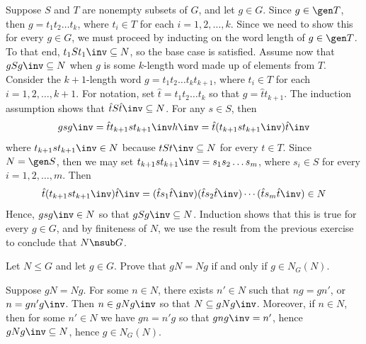 \begin{problems}
\begin{sol}
        \noindent \leftimp Suppose $S$ and $T$ are nonempty subsets of $G$, and let $g \in G$. Since $g \in \gen T$, then $g = t_1t_2 \dots t_k$, where $t_i \in T$ for each $i = 1, 2, \ldots, k$. Since we need to show this for every $g \in G$, we must proceed by inducting on the word length of $g \in \gen T$. To that end, $t_1St_1\inv \subseteq N$, so the base case is satisfied. Assume now that $gSg\inv \subseteq N$ when $g$ is some $k$-length word made up of elements from $T$. Consider the $k+1$-length word $g = t_1t_2 \ldots t_kt_{k + 1}$, where $t_i \in T$ for each $i = 1, 2, \ldots, k + 1$. For notation, set $\hat t = t_1t_2 \ldots t_k$ so that $g = \hat tt_{k + 1}$. The induction assumption shows that $\hat tS\hat t\inv \subseteq N$. For any $s \in S$, then 
        \[gsg\inv = \hat tt_{k + 1}st_{k + 1}\inv h\inv = \hat t(t_{k + 1}st_{k + 1}\inv)\hat t\inv\]
        where $t_{k + 1}st_{k + 1}\inv \in N$ because $tSt\inv \subseteq N$ for every $t \in T$. Since $N = \gen S$, then we may set $t_{k + 1}st_{k + 1}\inv = s_1s_2 \ldots s_m$, where $s_i \in S$ for every $i = 1, 2, \ldots, m$. Then
        \[\hat t(t_{k + 1}st_{k + 1}\inv)\hat t\inv = (\hat ts_1\hat t\inv)(\hat ts_2 \hat t\inv) \cdots (\hat ts_m \hat t\inv) \in N\]
        Hence, $gsg\inv \in N$ so that $gSg\inv \subseteq N$. Induction shows that this is true for every $g \in G$, and by finiteness of $N$, we use the result from the previous exercise to conclude that $N \nsub G$.
    \end{sol}
    \item Let $N \le G$ and let $g \in G$. Prove that $gN = Ng$ if and only if $g \in N_G(N)$.
    \begin{sol}
        \rightimp Suppose $gN = Ng$. For some $n \in N$, there exists $n' \in N$ such that $ng = gn'$, or $n = gn'g\inv$. Then $n \in gNg\inv$ so that $N \subseteq gNg\inv$. Moreover, if $n \in N$, then for some $n' \in N$ we have $gn = n'g$ so that $gng\inv = n'$, hence $gNg\inv \subseteq N$, hence $g \in N_G(N)$.
        

\end{sol}
\end{problems}
